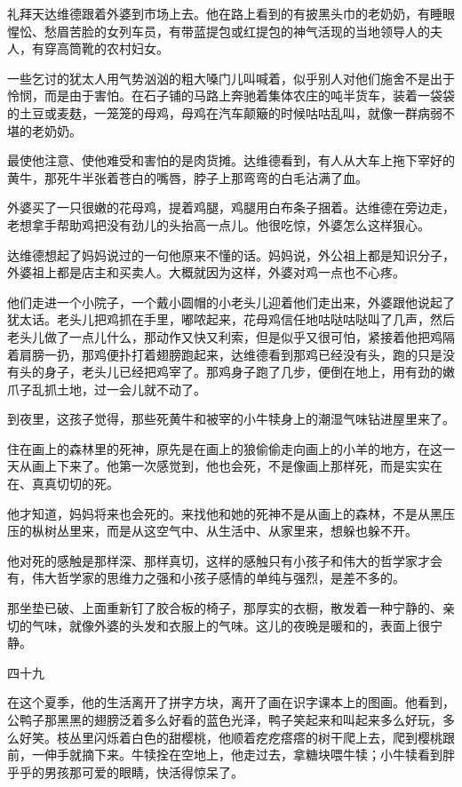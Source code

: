 礼拜天达维德跟着外婆到市场上去。他在路上看到的有披黑头巾的老奶奶，有睡眼惺忪、愁眉苦脸的女列车员，有带蓝提包或红提包的神气活现的当地领导人的夫人，有穿高筒靴的农村妇女。

一些乞讨的犹太人用气势汹汹的粗大嗓门儿叫喊着，似乎别人对他们施舍不是出于怜悯，而是由于害怕。在石子铺的马路上奔驰着集体农庄的吨半货车，装着一袋袋的土豆或麦麸，一笼笼的母鸡，母鸡在汽车颠簸的时候咕咕乱叫，就像一群病弱不堪的老奶奶。

最使他注意、使他难受和害怕的是肉货摊。达维德看到，有人从大车上拖下宰好的黄牛，那死牛半张着苍白的嘴唇，脖子上那弯弯的白毛沾满了血。

外婆买了一只很嫩的花母鸡，提着鸡腿，鸡腿用白布条子捆着。达维德在旁边走，老想拿手帮助鸡把没有劲儿的头抬高一点儿。他很吃惊，外婆怎么这样狠心。

达维德想起了妈妈说过的一句他原来不懂的话。妈妈说，外公祖上都是知识分子，外婆祖上都是店主和买卖人。大概就因为这样，外婆对鸡一点也不心疼。

他们走进一个小院子，一个戴小圆帽的小老头儿迎着他们走出来，外婆跟他说起了犹太话。老头儿把鸡抓在手里，嘟哝起来，花母鸡信任地咕哒咕哒叫了几声，然后老头儿做了一点儿什么，那动作又快又利索，但是似乎又很可怕，紧接着他把鸡隔着肩膀一扔，那鸡便扑打着翅膀跑起来，达维德看到那鸡已经没有头，跑的只是没有头的身子，老头儿已经把鸡宰了。那鸡身子跑了几步，便倒在地上，用有劲的嫩爪子乱抓土地，过一会儿就不动了。

到夜里，这孩子觉得，那些死黄牛和被宰的小牛犊身上的潮湿气味钻进屋里来了。

住在画上的森林里的死神，原先是在画上的狼偷偷走向画上的小羊的地方，在这一天从画上下来了。他第一次感觉到，他也会死，不是像画上那样死，而是实实在在、真真切切的死。

他才知道，妈妈将来也会死的。来找他和她的死神不是从画上的森林，不是从黑压压的枞树丛里来，而是从这空气中、从生活中、从家里来，想躲也躲不开。

他对死的感触是那样深、那样真切，这样的感触只有小孩子和伟大的哲学家才会有，伟大哲学家的思维力之强和小孩子感情的单纯与强烈，是差不多的。

那坐垫已破、上面重新钉了胶合板的椅子，那厚实的衣橱，散发着一种宁静的、亲切的气味，就像外婆的头发和衣服上的气味。这儿的夜晚是暖和的，表面上很宁静。

四十九

在这个夏季，他的生活离开了拼字方块，离开了画在识字课本上的图画。他看到，公鸭子那黑黑的翅膀泛着多么好看的蓝色光泽，鸭子笑起来和叫起来多么好玩，多么好笑。枝丛里闪烁着白色的甜樱桃，他顺着疙疙瘩瘩的树干爬上去，爬到樱桃跟前，一伸手就摘下来。牛犊拴在空地上，他走过去，拿糖块喂牛犊；小牛犊看到胖乎乎的男孩那可爱的眼睛，快活得惊呆了。

